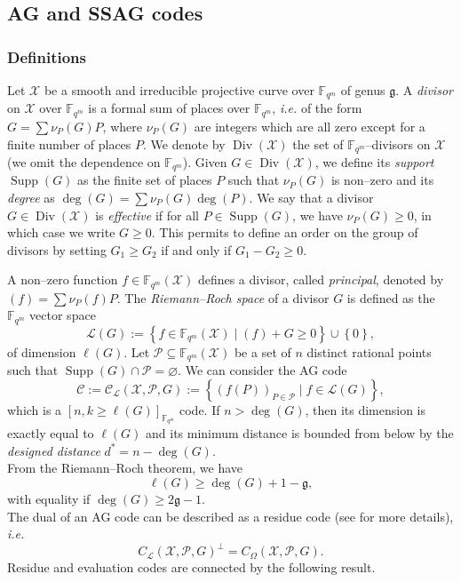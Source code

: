 \documentclass[a4paper]{amsart}
\theoremstyle{definition}
\theoremstyle{remark}
\newcommand{\calP}{\mathcal{P}}
\newcommand{\calL}{\mathcal{L}}
\newcommand{\calC}{\mathcal{C}}
\newcommand{\calX}{\mathcal{X}}
\newcommand{\fqm}{\mathbb{F}_{q^m}}
\newcommand{\set}[1]{\left\{#1\right\}}
\newcommand{\Supp}{\operatorname{Supp}}
\newcommand{\Div}{\operatorname{Div}}
\begin{document}
\subsection{AG and SSAG codes} \label{section:AG_codes}

\subsubsection{Definitions}

Let $\calX$ be a smooth and irreducible projective curve over $\fqm$ of genus $\mathfrak{g}$. A \emph{divisor} on $\calX$ over $\fqm$ is a formal sum of places over $\fqm$, \emph{i.e.} of the form $G=\sum \nu_P(G) P$, where $\nu_P(G)$ are integers which are all zero except for a finite number of places $P$. We denote by $\Div(\calX)$ the set of $\fqm$--divisors on $\calX$ (we omit the dependence on $\fqm$).
Given $G \in \Div(\calX)$, we define its \emph{support} $\Supp(G)$ as the finite set of places $P$ such that $\nu_P(G)$ is non--zero and its \emph{degree} as $\deg(G)=\sum \nu_P(G) \deg(P)$. We say that a divisor $G \in \Div(\calX)$ is \emph{effective} if for all $P \in \Supp(G)$, we have $\nu_P(G) \geq 0$, in which case we write $G \geq 0$. This permits to define an order on the group of divisors by setting $G_1 \geq G_2$ if and only if $G_1-G_2 \geq 0$.


A non--zero function $f \in \fqm(\calX)$ defines a divisor, called \emph{principal}, denoted by $(f)=\sum \nu_P(f) P$. The \emph{Riemann--Roch space} of a divisor $G$ is defined as the $\fqm$ vector space
$$ \calL(G) := \set{f \in \fqm(\calX) \mid (f) + G \geq 0} \cup \set{0},$$
of dimension $\ell(G)$.
Let $\calP \subseteq \fqm(\calX)$ be a set of $n$ distinct rational points such that $\Supp(G) \cap \calP = \varnothing$.
We can consider the AG code 
$$\calC := \calC_{\calL}(\calX,\calP,G) := \set{\left(f(P)\right)_{P \in \calP} \mid f \in \calL(G)},$$
which is a $[n, k \geq \ell(G)]_{\fqm}$ code. If $n > \deg (G)$, then its dimension is exactly equal to $\ell(G)$ and its minimum distance is bounded from below by the \emph{designed distance} $d^*=n-\deg (G)$.\\
From the Riemann--Roch theorem, we have
$$ \ell(G) \geq \deg(G) +1 - \mathfrak{g},$$ 
with equality if $\deg(G) \geq 2\mathfrak{g}-1$.\\

The dual of an AG code can be described as a residue code (see \cite{Sti09} for more details), \emph{i.e.}
$$ C_{\calL}(\calX,\calP,G)^{\perp} = C_{\Omega}(\calX,\calP,G).$$ 
Residue and evaluation codes are connected by the following result.
\end{document}
